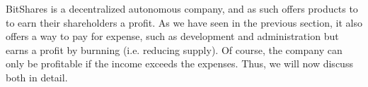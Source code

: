 BitShares is a decentralized autonomous company, and as such offers products to
to earn their shareholders a profit. As we have seen in the previous section,
it also offers a way to pay for expense, such as development and administration
but earns a profit by burnning (i.e. reducing supply). Of course, the company
can only be profitable if the income exceeds the expenses. Thus, we will now
discuss both in detail.
